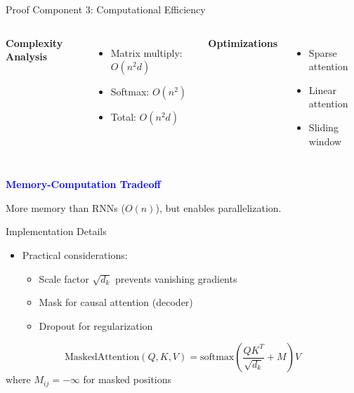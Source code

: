 \documentclass[serif, aspectratio=169]{beamer}
\begin{document}
\begin{frame}{Proof Component 3: Computational Efficiency}
    \begin{columns}
        \textbf{Complexity Analysis}
        \begin{itemize}
            \item Matrix multiply: $O(n^2d)$
            \item Softmax: $O(n^2)$
            \item Total: $O(n^2d)$
        \end{itemize}
        
        \textbf{Optimizations}
        \begin{itemize}
            \item Sparse attention
            \item Linear attention
            \item Sliding window
        \end{itemize}
    \end{columns}

    \vspace{0.5cm}
    \textcolor{blue}{\textbf{Memory-Computation Tradeoff}}
    
    \vspace{0.2cm}
    More memory than RNNs ($O(n)$), but enables parallelization.
    
\end{frame}

\begin{frame}{Implementation Details}
    \begin{itemize}
        \item Practical considerations:
        \begin{itemize}
            \item Scale factor $\sqrt{d_k}$ prevents vanishing gradients
            \item Mask for causal attention (decoder)
            \item Dropout for regularization
        \end{itemize}
    \end{itemize}
    \begin{equation*}
        \text{MaskedAttention}(Q, K, V) = \text{softmax}\left(\frac{QK^T}{\sqrt{d_k}} + M\right)V
    \end{equation*}
    where $M_{ij} = -\infty$ for masked positions
\end{frame}
\end{document}
